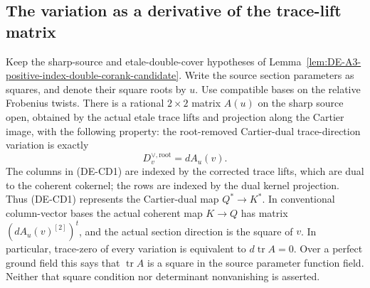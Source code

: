 \subsection{The variation as a derivative of the trace-lift matrix}

\begin{lemma}
\label{lem:DE-A3-positive-cup-derivative-candidate}
Keep the sharp-source and etale-double-cover hypotheses of
Lemma~\ref{lem:DE-A3-positive-index-double-corank-candidate}.
Write the source section parameters as squares, and denote their
square roots by $u$. Use compatible bases on the relative Frobenius
twists. There is a rational $2\times2$ matrix $A(u)$ on the sharp
source open, obtained by the actual etale trace lifts and projection
along the Cartier image, with the following property: the root-removed
Cartier-dual trace-direction variation is exactly
\[
                         D^{\vee,\mathrm{root}}_v=dA_u(v).
                                                        \tag{DE-CD1}
\]
The columns in (DE-CD1) are indexed by the corrected trace lifts,
which are dual to the coherent cokernel; the rows are indexed by the
dual kernel projection. Thus (DE-CD1) represents the Cartier-dual map
$Q^*\to K^*$. In conventional column-vector bases the actual coherent
map $K\to Q$ has matrix $(dA_u(v)^{[2]})^t$, and the actual section
direction is the square of $v$. In particular, trace-zero of every variation is equivalent
to $d\operatorname{tr}A=0$. Over a perfect ground field this says that
$\operatorname{tr}A$ is a square in the source parameter function field.
Neither that square condition nor determinant nonvanishing is asserted.
\end{lemma}
